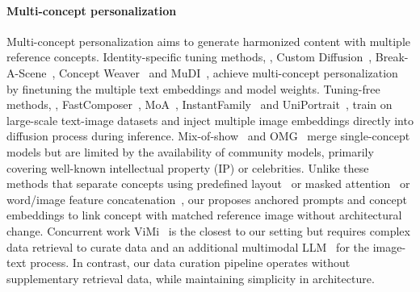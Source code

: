\paragraph{Multi-concept personalization}
Multi-concept personalization aims to generate harmonized content with multiple reference concepts.
Identity-specific tuning methods, \eg, Custom Diffusion~\cite{kumari2023multi}, Break-A-Scene~\cite{avrahami2023break}, Concept Weaver~\cite{kwon2024concept} and MuDI~\cite{jang2024identity}, achieve multi-concept personalization by finetuning the multiple text embeddings and model weights.
Tuning-free methods, \eg, FastComposer~\cite{xiao2024fastcomposer}, MoA~\cite{ostashev2024moa}, InstantFamily~\cite{kim2024instantfamily} and UniPortrait~\cite{he2024uniportrait}, train on large-scale text-image datasets and inject multiple image embeddings directly into diffusion process during inference.
Mix-of-show~\cite{gu2024mix} and OMG~\cite{kong2024omg} merge single-concept models but are limited by the availability of community models, primarily covering well-known intellectual property (IP) or celebrities.
Unlike these methods that separate concepts using predefined layout~\cite{liu2023cones,gu2024mix} or masked attention~\cite{xiao2024fastcomposer,kim2024instantfamily,kim2024instantfamily,ostashev2024moa} or word/image feature concatenation~\cite{chen2025multi}, our \workname proposes anchored prompts and concept embeddings to link concept with matched reference image without architectural change.
Concurrent work ViMi~\cite{fang2024vimi} is the closest to our setting but requires complex data retrieval to curate data and an additional multimodal LLM~\cite{liu2024visual} for the image-text process. In contrast, our data curation pipeline operates without supplementary retrieval data, while maintaining simplicity in architecture.
